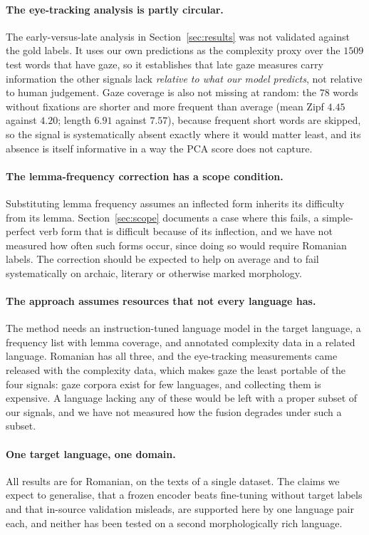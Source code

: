 \paragraph{The eye-tracking analysis is partly circular.}
The early-versus-late analysis in Section~\ref{sec:results} was not
validated against the gold labels. It uses our own predictions as the
complexity proxy over the $1509$ test words that have gaze, so it
establishes that late gaze measures carry information the other signals
lack \emph{relative to what our model predicts}, not relative to human
judgement. Gaze coverage is also not missing at random: the $78$ words
without fixations are shorter and more frequent than average (mean Zipf
$4.45$ against $4.20$; length $6.91$ against $7.57$), because frequent
short words are skipped, so the signal is systematically absent exactly
where it would matter least, and its absence is itself informative in a
way the PCA score does not capture.

\paragraph{The lemma-frequency correction has a scope condition.}
Substituting lemma frequency assumes an inflected form inherits its
difficulty from its lemma. Section~\ref{sec:scope} documents a case
where this fails, a simple-perfect verb form that is difficult because
of its inflection, and we have not measured how often such forms occur,
since doing so would require Romanian labels. The correction should be
expected to help on average and to fail systematically on archaic,
literary or otherwise marked morphology.

\paragraph{The approach assumes resources that not every language has.}
The method needs an instruction-tuned language model in the target
language, a frequency list with lemma coverage, and annotated complexity
data in a related language. Romanian has all three, and the eye-tracking
measurements came released with the complexity data, which makes gaze
the least portable of the four signals: gaze corpora exist for few
languages, and collecting them is expensive. A language lacking any of
these would be left with a proper subset of our signals, and we have not
measured how the fusion degrades under such a subset.

\paragraph{One target language, one domain.}
All results are for Romanian, on the texts of a single dataset. The
claims we expect to generalise, that a frozen encoder beats fine-tuning
without target labels and that in-source validation misleads, are
supported here by one language pair each, and neither has been tested on
a second morphologically rich language.


%





